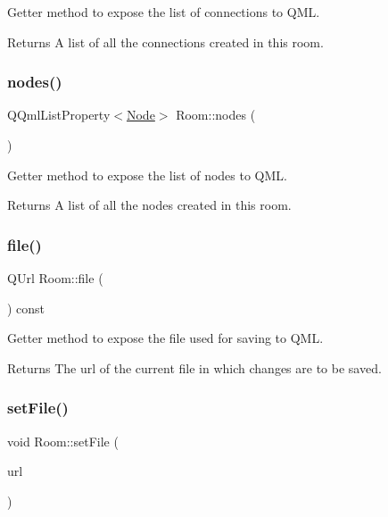 Getter method to expose the list of connections to Q\+ML. 

\begin{DoxyReturn}{Returns}
A list of all the connections created in this room. 
\end{DoxyReturn}
\mbox{\label{classRoom_a9ed01ab71422acf2c22b46d7f582f878}} 
\subsubsection{\texorpdfstring{nodes()}{nodes()}}
{\footnotesize\ttfamily Q\+Qml\+List\+Property$<$\mbox{\hyperlink{classNode}{Node}}$>$ Room\+::nodes (\begin{DoxyParamCaption}{ }\end{DoxyParamCaption})}



Getter method to expose the list of nodes to Q\+ML. 

\begin{DoxyReturn}{Returns}
A list of all the nodes created in this room. 
\end{DoxyReturn}
\mbox{\label{classRoom_ab6644a3874458fbeffd5fa2951d281ab}} 
\subsubsection{\texorpdfstring{file()}{file()}}
{\footnotesize\ttfamily Q\+Url Room\+::file (\begin{DoxyParamCaption}{ }\end{DoxyParamCaption}) const}



Getter method to expose the file used for saving to Q\+ML. 

\begin{DoxyReturn}{Returns}
The url of the current file in which changes are to be saved. 
\end{DoxyReturn}
\mbox{\label{classRoom_afe61f8f1359a431ef906ee2ff485eb80}} 
\subsubsection{\texorpdfstring{set\+File()}{setFile()}}
{\footnotesize\ttfamily void Room\+::set\+File (\begin{DoxyParamCaption}\item[{const Q\+Url \&}]{url }\end{DoxyParamCaption})}




